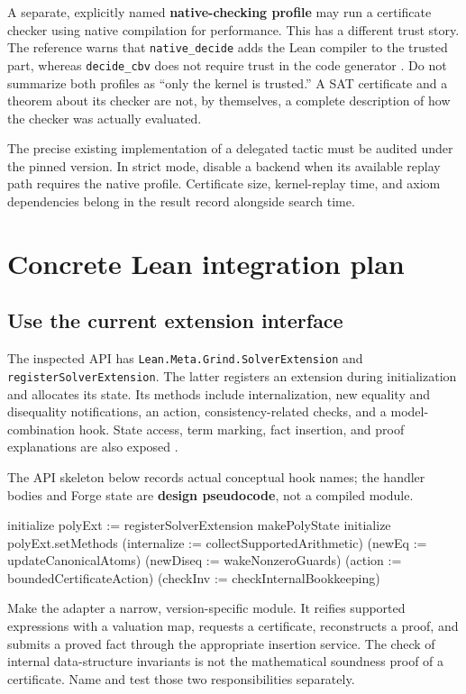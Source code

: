\documentclass[11pt,a4paper]{article}
\newcommand{\code}[1]{\texttt{\small #1}}
\begin{document}
A separate, explicitly named \textbf{native-checking profile} may run a
certificate checker using native compilation for performance. This has a
different trust story. The reference warns that \code{native\_decide} adds the
Lean compiler to the trusted part, whereas \code{decide\_cbv} does not require
trust in the code generator \cite{lean-tactics}. Do not summarize both profiles
as ``only the kernel is trusted.'' A SAT certificate and a theorem about its
checker are not, by themselves, a complete description of how the checker was
actually evaluated.

The precise existing implementation of a delegated tactic must be audited
under the pinned version. In strict mode, disable a backend when its available
replay path requires the native profile. Certificate size, kernel-replay time,
and axiom dependencies belong in the result record alongside search time.

\section{Concrete Lean integration plan}

\subsection{Use the current extension interface}

The inspected API has \code{Lean.Meta.Grind.SolverExtension} and
\code{registerSolverExtension}. The latter registers an extension during
initialization and allocates its state. Its methods include internalization,
new equality and disequality notifications, an action, consistency-related
checks, and a model-combination hook. State access, term marking, fact insertion,
and proof explanations are also exposed \cite{grind-types}.

The API skeleton below records actual conceptual hook names; the handler
bodies and Forge state are \textbf{design pseudocode}, not a compiled module.

\begin{Code}
initialize polyExt := registerSolverExtension makePolyState
initialize polyExt.setMethods
  (internalize := collectSupportedArithmetic)
  (newEq       := updateCanonicalAtoms)
  (newDiseq    := wakeNonzeroGuards)
  (action      := boundedCertificateAction)
  (checkInv    := checkInternalBookkeeping)
\end{Code}

Make the adapter a narrow, version-specific module. It reifies supported
expressions with a valuation map, requests a certificate, reconstructs a
proof, and submits a proved fact through the appropriate insertion service.
The check of internal data-structure invariants is not the mathematical
soundness proof of a certificate. Name and test those two responsibilities
separately.
\end{document}
